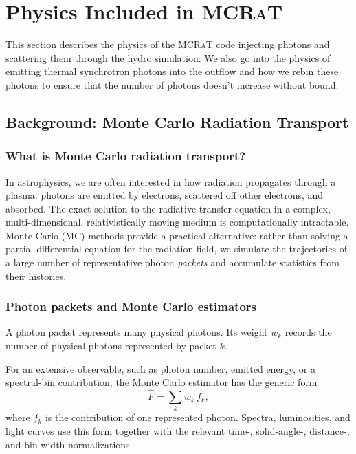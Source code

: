 \documentclass[12pt,a4paper]{article}
\newcommand{\mcrat}{\textsc{MCRaT}}
\begin{document}
\section{Physics Included in \mcrat{}}
This section describes the physics of the \mcrat{} code injecting photons and scattering them through the hydro simulation. We also go into the physics of emitting thermal synchrotron photons into the outflow and how we rebin these photons to ensure that the number of photons doesn't increase without bound.

\subsection{Background: Monte Carlo Radiation Transport}
\label{sec:background}

\subsubsection{What is Monte Carlo radiation transport?}

In astrophysics, we are often interested in how radiation propagates through
a plasma: photons are emitted by electrons, scattered off other electrons,
and absorbed.  The exact solution to the radiative transfer equation in a
complex, multi-dimensional, relativistically moving medium is computationally
intractable.  Monte Carlo (MC) methods provide a practical alternative: rather
than solving a partial differential equation for the radiation field, we
simulate the trajectories of a large number of representative photon
\emph{packets} and accumulate statistics from their histories.

\subsubsection{Photon packets and Monte Carlo estimators}

A photon packet represents many physical photons. Its weight \(w_k\)
records the number of physical photons represented by packet \(k\).

For an extensive observable, such as photon number, emitted energy, or
a spectral-bin contribution, the Monte Carlo estimator has the generic
form
\begin{equation}
	\widehat{F}
	=
	\sum_k
	w_k\,f_k,
	\label{eq:estimator_extensive}
\end{equation}
where \(f_k\) is the contribution of one represented photon. Spectra,
luminosities, and light curves use this form together with the relevant
time-, solid-angle-, distance-, and bin-width normalizations.
\end{document}
